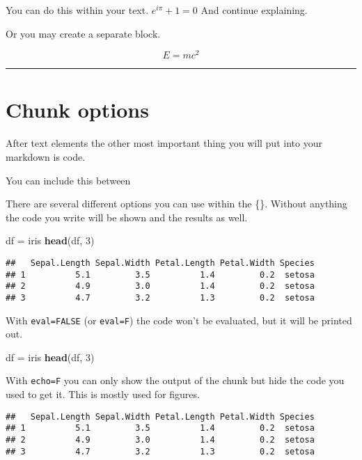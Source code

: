 \documentclass[]{article}
\newenvironment{Shaded}{\begin{snugshade}}{\end{snugshade}}
\newcommand{\DecValTok}[1]{\textcolor[rgb]{0.00,0.00,0.81}{#1}}
\newcommand{\KeywordTok}[1]{\textcolor[rgb]{0.13,0.29,0.53}{\textbf{#1}}}
\newcommand{\NormalTok}[1]{#1}
\newcommand{\StringTok}[1]{\textcolor[rgb]{0.31,0.60,0.02}{#1}}
\begin{document}
You can do this within your text. \(e^{i \pi} + 1 = 0\) And continue
explaining.

Or you may create a separate block.

\[E = mc^{2}\]

\begin{center}\rule{0.5\linewidth}{0.5pt}\end{center}

\hypertarget{chunk-options}{%
\section{Chunk options}\label{chunk-options}}

After text elements the other most important thing you will put into
your markdown is code.

You can include this between

There are several different options you can use within the \{\}. Without
anything the code you write will be shown and the results as well.

\begin{Shaded}
\begin{Highlighting}[]
\NormalTok{df =}\StringTok{ }\NormalTok{iris}
\KeywordTok{head}\NormalTok{(df, }\DecValTok{3}\NormalTok{)}
\end{Highlighting}
\end{Shaded}

\begin{verbatim}
##   Sepal.Length Sepal.Width Petal.Length Petal.Width Species
## 1          5.1         3.5          1.4         0.2  setosa
## 2          4.9         3.0          1.4         0.2  setosa
## 3          4.7         3.2          1.3         0.2  setosa
\end{verbatim}

With \texttt{eval=FALSE} (or \texttt{eval=F}) the code won't be
evaluated, but it will be printed out.

\begin{Shaded}
\begin{Highlighting}[]
\NormalTok{df =}\StringTok{ }\NormalTok{iris}
\KeywordTok{head}\NormalTok{(df, }\DecValTok{3}\NormalTok{)}
\end{Highlighting}
\end{Shaded}

With \texttt{echo=F} you can only show the output of the chunk but hide
the code you used to get it. This is mostly used for figures.

\begin{verbatim}
##   Sepal.Length Sepal.Width Petal.Length Petal.Width Species
## 1          5.1         3.5          1.4         0.2  setosa
## 2          4.9         3.0          1.4         0.2  setosa
## 3          4.7         3.2          1.3         0.2  setosa
\end{verbatim}
\end{document}
